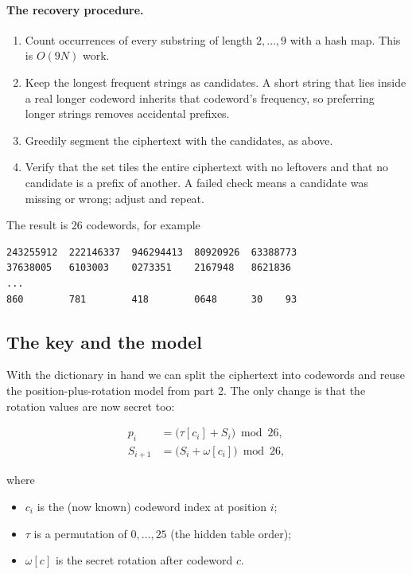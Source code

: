 \documentclass[11pt]{article}
\begin{document}
\paragraph{The recovery procedure.}
\begin{enumerate}[label=\arabic*.]
  \item Count occurrences of every substring of length $2,\dots,9$ with a hash
        map.  This is $O(9N)$ work.
  \item Keep the longest frequent strings as candidates.  A short string that
        lies inside a real longer codeword inherits that codeword's frequency,
        so preferring longer strings removes accidental prefixes.
  \item Greedily segment the ciphertext with the candidates, as above.
  \item Verify that the set tiles the entire ciphertext with no leftovers and
        that no candidate is a prefix of another.  A failed check means a
        candidate was missing or wrong; adjust and repeat.
\end{enumerate}

The result is 26 codewords, for example

\begin{lstlisting}
243255912  222146337  946294413  80920926  63388773
37638005   6103003    0273351    2167948   8621836
...
860        781        418        0648      30    93
\end{lstlisting}

\subsection{The key and the model}

With the dictionary in hand we can split the ciphertext into codewords and
reuse the position-plus-rotation model from part 2.  The only change is that
the rotation values are now secret too:

\begin{align}
p_i &= \bigl(\tau[c_i] + S_i\bigr)\bmod 26,\label{eq:p3}\\
S_{i+1} &= \bigl(S_i + \omega[c_i]\bigr)\bmod 26,\label{eq:shift}
\end{align}

where

\begin{itemize}
  \item $c_i$ is the (now known) codeword index at position $i$;
  \item $\tau$ is a permutation of $0,\dots,25$ (the hidden table order);
  \item $\omega[c]$ is the secret rotation after codeword $c$.
\end{itemize}
\end{document}
